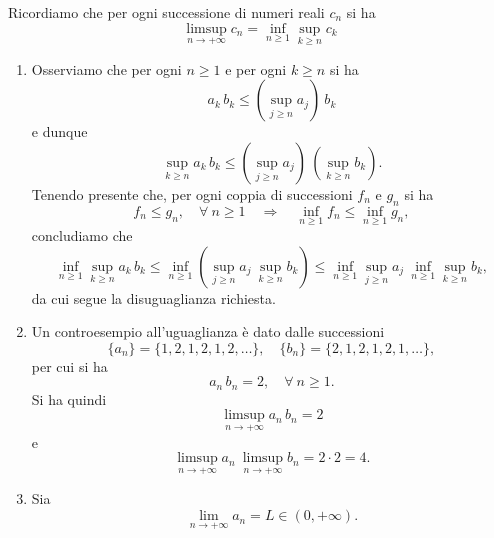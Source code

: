 \begin{demonstration}
	Ricordiamo che per ogni successione di numeri reali $c_n$ si ha
	\begin{equation*}
		\limsup_{n\to +\infty} c_n =\inf_{n\geq 1} \sup_{k\geq n} c_k
	\end{equation*}
	\begin{enumerate}
		\item Osserviamo che per ogni $n\geq 1$ e per ogni $k\geq n$ si ha
		\begin{equation*}
			a_k\, b_k\leq \left(\sup_{j\geq n} a_j \right)\ b_k
		\end{equation*}
		e dunque
		\begin{equation*}
			\sup_{k\geq n} a_k\, b_k\leq \left(\sup_{j\geq n} a_j \right)\ \left(\sup_{k\geq n} b_k \right).
		\end{equation*}
		Tenendo presente che, per ogni coppia di successioni $f_n$ e $g_n$ si ha
		\begin{equation*}
			f_n\leq g_n,\quad \forall \ n\geq 1 \quad \Longrightarrow \quad \inf_{n\geq 1} f_n\leq \inf_{n\geq 1} g_n,
		\end{equation*}
		concludiamo che
		\begin{equation*}
			\inf_{n\geq 1} \sup_{k\geq n} a_k\, b_k\leq \inf_{n\geq 1}\left(\sup_{j\geq n} a_j \ \sup_{k\geq n} b_k \right)\leq \inf_{n\geq 1} \sup_{j\geq n} a_j\ \inf_{n\geq 1} \sup_{k\geq n} b_k,
		\end{equation*} 
		da cui segue la disuguaglianza richiesta.
		\item Un controesempio all'uguaglianza è dato dalle successioni
		\begin{equation*}
			\{a_n\}=\{1, 2, 1, 2, 1, 2, \ldots \},\quad \{ b_n\} = \{2, 1, 2, 1, 2, 1,\ldots \},
		\end{equation*}
		per cui si ha
		\begin{equation*}
			a_n\, b_n=2,\quad \forall \ n\geq 1.
		\end{equation*}
		Si ha quindi
		\begin{equation*}
			\limsup_{n\to +\infty} a_n \, b_n = 2
		\end{equation*}
		e
		\begin{equation*}
			\limsup_{n\to +\infty} a_n \ \limsup_{n\to +\infty} b_n = 2\cdot 2=4.
		\end{equation*}
	\item Sia
	\begin{equation*}
		\lim_{n\to +\infty} a_n =L \in (0,+\infty).

\end{equation*}
\end{enumerate}
\end{demonstration}
